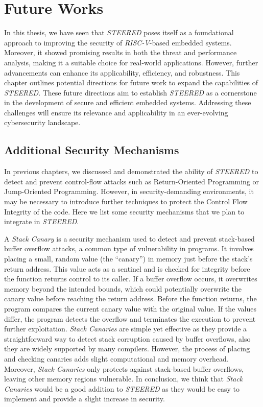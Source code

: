 \chapter{Future Works}
\label{cha:future}

In this thesis, we have seen that \textit{STEERED} poses itself as a
foundational approach to improving the security of \textit{RISC-V}-based embedded
systems. Moreover, it showed promising results in both the threat and performance
analysis, making it a suitable choice for real-world applications. However,
further advancements can enhance its applicability, efficiency, and robustness. This
chapter outlines potential directions for future work to expand the capabilities
of \textit{STEERED}. These future directions aim to establish \textit{STEERED}
as a cornerstone in the development of secure and efficient embedded systems. Addressing
these challenges will ensure its relevance and applicability in an ever-evolving
cybersecurity landscape.

\section{Additional Security Mechanisms}
\label{sec:future_security}

In previous chapters, we discussed and demonstrated the ability of \textit{STEERED}
to detect and prevent control-flow attacks such as Return-Oriented Programming
or Jump-Oriented Programming. However, in security-demanding environments, it may
be necessary to introduce further techniques to protect the Control Flow Integrity
of the code. Here we list some security mechanisms that we plan to integrate in
\textit{STEERED}.

A \textit{Stack Canary} is a security mechanism used to detect and prevent stack-based
buffer overflow attacks, a common type of vulnerability in programs. It involves
placing a small, random value (the ``canary'') in memory just before the stack's
return address. This value acts as a sentinel and is checked for integrity
before the function returns control to its caller. If a buffer overflow occurs,
it overwrites memory beyond the intended bounds, which could potentially overwrite
the canary value before reaching the return address. Before the function returns,
the program compares the current canary value with the original value. If the
values differ, the program detects the overflow and terminates the execution to prevent
further exploitation. \textit{Stack Canaries} are simple yet effective as they provide
a straightforward way to detect stack corruption caused by buffer overflows,
also they are widely supported by many compilers. However, the process of
placing and checking canaries adds slight computational and memory overhead. Moreover,
\textit{Stack Canaries} only protects against stack-based buffer overflows,
leaving other memory regions vulnerable. In conclusion, we think that \textit{Stack
Canaries} would be a good addition to \textit{STEERED} as they would be easy to
implement and provide a slight increase in security.

